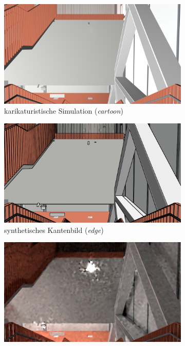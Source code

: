 \begin{figure}
	\centering
	\begin{subfigure}[t]{0.24\linewidth}
		\centering
		\includegraphics[width=\linewidth]{images/syn_dataset/b00188.png}
		\caption{\RaggedRight karikaturistische Simulation \hspace{2cm} (\textit{cartoon})}
		\label{subfig:cartoonish}
	\end{subfigure}
	\hfill
	\begin{subfigure}[t]{0.24\linewidth}
		\centering
		\includegraphics[width=\linewidth]{images/syn_dataset/e00188.png}
		\caption{\RaggedRight synthetisches Kantenbild \hspace{2cm} (\textit{edge})}
		\label{subfig:edge}
	\end{subfigure}
	\hfill
	\begin{subfigure}[t]{0.24\linewidth}
		\centering
		\includegraphics[width=\linewidth]{images/syn_dataset/c00188.png}

\end{subfigure}
\end{figure}
